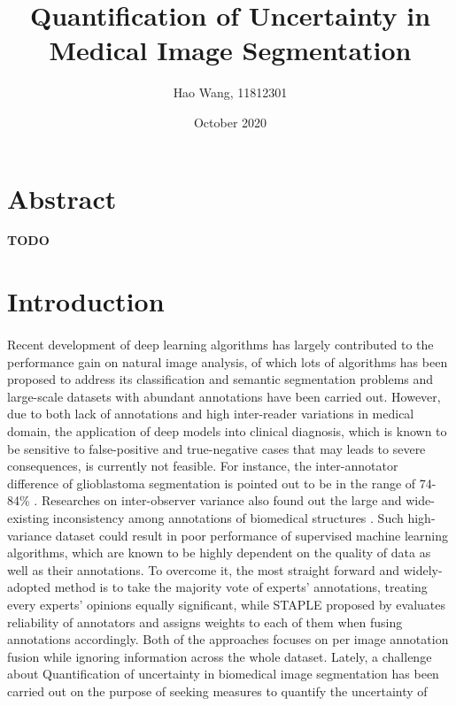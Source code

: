\documentclass[12pt]{extarticle}
\title{Quantification of Uncertainty in Medical Image Segmentation}
\author{Hao Wang, 11812301}
\date{October 2020}
\begin{document}
\maketitle
\section*{Abstract}
\textbf{TODO}
\section{Introduction}
\paragraph{}
Recent development of deep learning algorithms has largely contributed to
the performance gain on natural image analysis, of which lots
of algorithms has been proposed to address its classification and semantic
segmentation problems and large-scale datasets with abundant annotations have been
carried out\cite{nair_precup_arnold_arbel_2020}.
However, due to
both lack of annotations and high inter-reader variations\cite{zhang2020disentangling}
in medical domain, the application of deep models into clinical diagnosis,
which is known to be sensitive to false-positive and true-negative cases that may leads
to severe consequences, is currently not feasible. 
For instance, the inter-annotator difference of glioblastoma segmentation
is pointed out to be in the range of 74-84\% \cite{6975210}.
Researches on inter-observer variance also found out
the large and wide-existing inconsistency among annotations of biomedical structures
\cite{Variability2019}\cite{interobserver2018}. Such high-variance dataset 
could result in poor performance of supervised machine learning algorithms,
which are known to be highly dependent on the quality of data as well as their annotations.
To overcome it, the most straight forward and widely-adopted method 
is to take the majority vote of experts' annotations, treating every 
experts' opinions equally significant\cite{6975210}, while STAPLE proposed by \cite{STAPLE} 
evaluates reliability of annotators and assigns weights to each of them when 
fusing annotations accordingly. Both of the approaches focuses on per image annotation fusion
while ignoring information across the whole dataset\cite{zhang2020disentangling}.
Lately, a challenge about Quantification of uncertainty 
in biomedical image segmentation has been carried
out on the purpose of seeking measures to quantify the uncertainty of 
\end{document}
